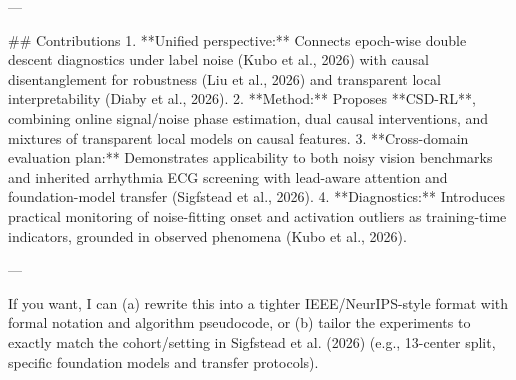 ---

## Contributions  
1. **Unified perspective:** Connects epoch-wise double descent diagnostics under label noise (Kubo et al., 2026) with causal disentanglement for robustness (Liu et al., 2026) and transparent local interpretability (Diaby et al., 2026).  
2. **Method:** Proposes **CSD-RL**, combining online signal/noise phase estimation, dual causal interventions, and mixtures of transparent local models on causal features.  
3. **Cross-domain evaluation plan:** Demonstrates applicability to both noisy vision benchmarks and inherited arrhythmia ECG screening with lead-aware attention and foundation-model transfer (Sigfstead et al., 2026).  
4. **Diagnostics:** Introduces practical monitoring of noise-fitting onset and activation outliers as training-time indicators, grounded in observed phenomena (Kubo et al., 2026).  

--- 

If you want, I can (a) rewrite this into a tighter IEEE/NeurIPS-style format with formal notation and algorithm pseudocode, or (b) tailor the experiments to exactly match the cohort/setting in Sigfstead et al. (2026) (e.g., 13-center split, specific foundation models and transfer protocols).